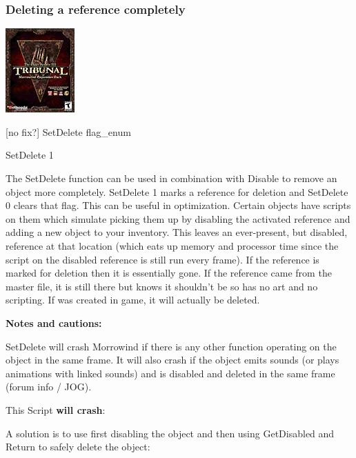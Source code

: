 \hypertarget{section-5}{%
\subsubsection{}\label{section-5}}

\hypertarget{deleting-a-reference-completely}{%
\subsubsection{Deleting a reference
completely}\label{deleting-a-reference-completely}}

\includegraphics{media/image6.png}

{[}no fix?{]} SetDelete flag\_enum

SetDelete 1

The SetDelete function can be used in combination with Disable to remove
an object more completely. SetDelete 1 marks a reference for deletion
and SetDelete 0 clears that flag. This can be useful in optimization.
Certain objects have scripts on them which simulate picking them up by
disabling the activated reference and adding a new object to your
inventory. This leaves an ever-present, but disabled, reference at that
location (which eats up memory and processor time since the script on
the disabled reference is still run every frame). If the reference is
marked for deletion then it is essentially gone. If the reference came
from the master file, it is still there but knows it shouldn't be so has
no art and no scripting. If was created in game, it will actually be
deleted.

\textbf{Notes and cautions:}

SetDelete will crash Morrowind if there is any other function operating
on the object in the same frame. It will also crash if the object emits
sounds (or plays animations with linked sounds) and is disabled and
deleted in the same frame (forum info / JOG).

This Script \textbf{will crash}:



A solution is to use first disabling the object and then using
GetDisabled and Return to safely delete the object:

